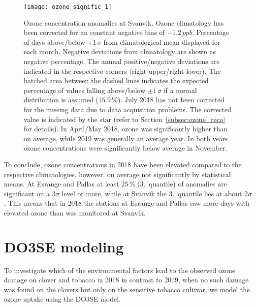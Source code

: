\documentclass[bg, manuscript]{copernicus}
\begin{document}
\begin{figure}[t]
  \texttt{[image: ozone\_signific\_1]}
  \caption{Ozone concentration anomalies at Svanvik. Ozone climatology has been corrected for an constant negative bias of $-1.2\,\unit{ppb}$. Percentage of days above/below $\pm 1\,\sigma$ from climatological mean displayed for each month. Negative deviations from climatology are shown as negative percentage. The annual positive/negative deviations are indicated in the respective corners (right upper/right lower). The hatched area between the dashed lines indicates the expected percentage of values falling above/below $\pm 1\,\sigma$ if a normal distribution is assumed ($15.9\,\unit{\%}$). July 2018 has not been corrected for the missing data due to data acquisition problems. The corrected value is indicated by the star (refer to Section~\ref{subsec:ozone_reco} for details). In April/May 2018, ozone was significantly higher than on average, while 2019 was generally an average year. In both years ozone concentrations were significantly below average in November.}
  \label{fig:ozone_signific}
\end{figure}

To conclude, ozone concentrations in 2018 have been elevated compared to the respective climatologies, however, on average not significantly by statistical means. At Esrange and Pallas at least $25\,\unit{\%}$ (3.~quantile) of anomalies are significant on a $3\sigma$ level or more, while at Svanvik the 3.~quantile lies at about $2\sigma$. This means that in 2018 the stations at Esrange and Pallas saw more days with elevated ozone than was monitored at Svanvik.

\section{DO3SE modeling}
\label{sec:do3se}
To investigate which of the environmental factors lead to the observed ozone damage on clover and tobacco in 2018 in contrast to 2019, when no such damage was found on the clovers but only on the sensitive tobacco cultivar, we model the ozone uptake using the DO3SE model.
\end{document}
